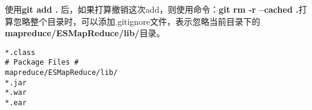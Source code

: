 \par 使用\textbf{git add . }后，如果打算撤销这次add，则使用命令：\textbf{git rm -r --cached .}打算忽略整个目录时，可以添加.gitignore文件，表示忽略当前目录下的\textbf{mapreduce/ESMapReduce/lib/}目录。
\begin{verbatim}
*.class
# Package Files #
mapreduce/ESMapReduce/lib/
*.jar
*.war
*.ear
\end{verbatim}
